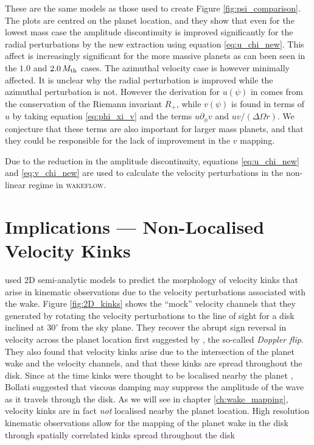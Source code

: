 These are the same models as those used to create Figure \ref{fig:psi_comparison}. 
The plots are centred on the planet location, and they show that even for the lowest mass case the amplitude discontinuity is improved significantly for the radial perturbations by the new extraction using equation \ref{eq:u_chi_new}. 
This affect is increasingly significant for the more massive planets as can been seen in the $1.0$ and $2.0 \, M_{\rm th}$ cases. The azimuthal velocity case is however minimally affected. 
It is unclear why the radial perturbation is improved while the azimuthal perturbation is not.
However the derivation for $u(\psi)$ in \citet{rafikov2002a} comes from the conservation of the Riemann invariant $R_+$, while $v(\psi)$ is found in terms of $u$ by taking equation \ref{eq:phi_xi_v} and the terms $u \partial_\phi v$ and $u v / (\Delta \Omega r)$.
We conjecture that these terms are also important for larger mass planets, and that they could be responsible for the lack of improvement in the $v$ mapping.

Due to the reduction in the amplitude discontinuity, equations \ref{eq:u_chi_new} and \ref{eq:v_chi_new} are used to calculate the velocity perturbations in the non-linear regime in \textsc{wakeflow}. 

\section{Implications --- Non-Localised Velocity Kinks}

\citet{bollati2021} used 2D semi-analytic models to predict the morphology of velocity kinks that arise in kinematic observations \citep{pinte2018a} due to the velocity perturbations associated with the wake.
Figure \ref{fig:2D_kinks} shows the ``mock'' velocity channels that they generated by rotating the velocity perturbations to the line of sight for a disk inclined at $30^\circ$ from the sky plane.
They recover the abrupt sign reversal in velocity across the planet location first suggested by \citet{casassus2019}, the so-called \textit{Doppler flip}.
They also found that velocity kinks arise due to the intersection of the planet wake and the velocity channels, and that these kinks are spread throughout the disk.
Since at the time kinks were thought to be localised nearby the planet \citep{pinte2018a,pinte2019,pinte2020}, Bollati suggested that viscous damping may suppress the amplitude of the wave as it travels through the disk.
As we will see in chapter \ref{ch:wake_mapping}, velocity kinks are in fact \textit{not} localised nearby the planet location.
High resolution kinematic observations allow for the mapping of the planet wake in the disk through spatially correlated kinks spread throughout the disk \citep{calcino2022,teague2022,verrios2022}

